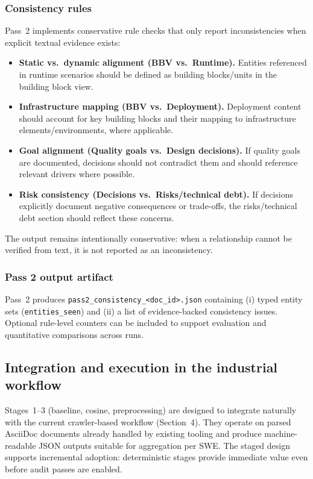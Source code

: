 \subsubsection{Consistency rules}
Pass~2 implements conservative rule checks that only report inconsistencies when explicit textual evidence exists:
\begin{itemize}
    \item \textbf{Static vs.\ dynamic alignment (BBV vs.\ Runtime).} Entities referenced in runtime scenarios should be defined as building blocks/units in the building block view.
    \item \textbf{Infrastructure mapping (BBV vs.\ Deployment).} Deployment content should account for key building blocks and their mapping to infrastructure elements/environments, where applicable.
    \item \textbf{Goal alignment (Quality goals vs.\ Design decisions).} If quality goals are documented, decisions should not contradict them and should reference relevant drivers where possible.
    \item \textbf{Risk consistency (Decisions vs.\ Risks/technical debt).} If decisions explicitly document negative consequences or trade-offs, the risks/technical debt section should reflect these concerns.
\end{itemize}

The output remains intentionally conservative: when a relationship cannot be verified from text, it is not reported as an inconsistency.

\subsubsection{Pass 2 output artifact}
Pass~2 produces \texttt{pass2\_consistency\_\textless doc\_id\textgreater.json} containing (i) typed entity sets (\texttt{entities\_seen}) and (ii) a list of evidence-backed consistency issues. Optional rule-level counters can be included to support evaluation and quantitative comparisons across runs.

\subsection{Integration and execution in the industrial workflow}
Stages~1--3 (baseline, cosine, preprocessing) are designed to integrate naturally with the current crawler-based workflow (Section~4). They operate on parsed AsciiDoc documents already handled by existing tooling and produce machine-readable JSON outputs suitable for aggregation per SWE. The staged design supports incremental adoption: deterministic stages provide immediate value even before audit passes are enabled.

